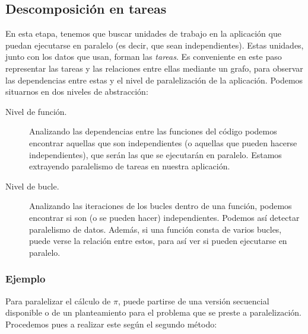 \subsection{Descomposición en tareas} 
En esta etapa, tenemos que buscar unidades de trabajo en la aplicación que puedan ejecutarse en paralelo (es decir, que sean independientes). Estas unidades, junto con los datos que usan, forman las \emph{tareas}. Es conveniente en este paso representar las tareas y las relaciones entre ellas mediante un grafo, para observar las dependencias entre estas y el nivel de paralelización de la aplicación. Podemos situarnos en dos niveles de abstracción:
\begin{description}
    \item [Nivel de función.] Analizando las dependencias entre las funciones del código podemos encontrar aquellas que son independientes (o aquellas que pueden hacerse independientes), que serán las que se ejecutarán en paralelo. Estamos extrayendo paralelismo de tareas en nuestra aplicación.
    \item [Nivel de bucle.] Analizando las iteraciones de los bucles dentro de una función, podemos encontrar si son (o se pueden hacer) independientes. Podemos así detectar paralelismo de datos. Además, si una función consta de varios bucles, puede verse la relación entre estos, para así ver si pueden ejecutarse en paralelo.
\end{description}

\subsubsection{Ejemplo} 
Para paralelizar el cálculo de $\pi$, puede partirse de una versión secuencial disponible o de un planteamiento para el problema que se preste a paralelización. Procedemos pues a realizar este según el segundo método:

